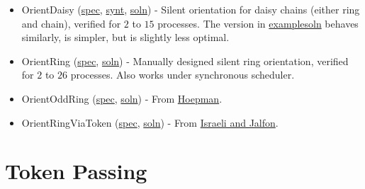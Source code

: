 \begin{itemize}
\item OrientDaisy (\href{examplespec/OrientDaisy.prot}{spec}, \href{examplesoln/OrientDaisy.prot}{synt}, \href{examplesoln/OrientDaisy.prot}{soln})
- Silent orientation for daisy chains (either ring and chain), verified for $2$ to $15$ processes.
The version in \url{examplesoln} behaves similarly, is simpler, but is slightly less optimal.
\item OrientRing (\href{examplespec/OrientRing.prot}{spec}, \href{examplespec/OrientRing.prot}{soln})
- Manually designed silent ring orientation, verified for $2$ to $26$ processes.
Also works under synchronous scheduler.
\item OrientOddRing (\href{examplespec/OrientOddRing.prot}{spec}, \href{examplesoln/OrientOddRing.prot}{soln})
- From \href{http://dx.doi.org/10.1007/BFb0020439}{Hoepman}.
\item OrientRingViaToken (\href{examplespec/OrientRingViaToken.prot}{spec}, \href{examplesoln/OrientRingViaToken.prot}{soln})
- From \href{http://dx.doi.org/10.1006/inco.1993.1029}{Israeli and Jalfon}.
\end{itemize}

\section{Token Passing}

